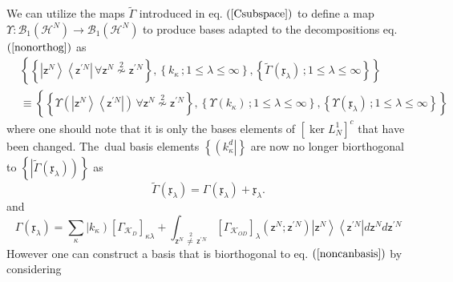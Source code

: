 \documentclass[aps,preprint]{revtex4}%
\begin{document}
We can utilize the maps $\tilde{\Gamma}$ introduced in eq. $\left(
\ref{Csubspace}\right)  $ to define a map $\Upsilon:\mathcal{B}_{1}\left(
\mathcal{H}^{N}\right)  \rightarrow\mathcal{B}_{1}\left(  \mathcal{H}%
^{N}\right)  $ to produce bases adapted to the decompositions eq. $\left(
\ref{nonorthog}\right)  $ as
\begin{align}
&  \left\{  \left\{  \left\vert \mathsf{z}^{N}\right\rangle \left\langle
\mathsf{z}^{\prime N}\right\vert \,\forall\mathsf{z}^{N}\overset{2}{\nsim
}\mathsf{z}^{\prime N}\right\}  ,\left\{  k_{\kappa}\,;1\leq\lambda\leq
\infty\right\}  ,\left\{  \tilde{\Gamma}\left(  \mathfrak{x}_{\lambda}\right)
\,;1\leq\lambda\leq\infty\right\}  \right\} \nonumber\\
&  \equiv\left\{  \left\{  \Upsilon\left(  \left\vert \mathsf{z}%
^{N}\right\rangle \left\langle \mathsf{z}^{\prime N}\right\vert \right)
\,\forall\mathsf{z}^{N}\overset{2}{\nsim}\mathsf{z}^{\prime N}\right\}
,\left\{  \Upsilon\left(  k_{\kappa}\right)  \,;1\leq\lambda\leq
\infty\right\}  ,\left\{  \Upsilon\left(  \mathfrak{x}_{\lambda}\right)
\,;1\leq\lambda\leq\infty\right\}  \right\}  \label{noncanbasis}%
\end{align}
where one should note that it is only the bases elements of $\left[  \ker
L_{N}^{1}\right]  ^{c}$ that have been changed. The\emph{\ }dual basis
elements $\left\{  \left(  k_{\kappa}^{d}\right\vert \right\}  $ are now no
longer biorthogonal to $\left\{  \left\vert \tilde{\Gamma}\left(
\mathfrak{x}_{\lambda}\right)  \right)  \right\}  $ as%
\begin{equation}
\tilde{\Gamma}\left(  \mathfrak{x}_{\lambda}\right)  =\Gamma\left(
\mathfrak{x}_{\lambda}\right)  +\mathfrak{x}_{\lambda}.
\end{equation}
and
\begin{equation}
\Gamma\left(  \mathfrak{x}_{\lambda}\right)  =\sum_{\kappa}\left\vert
k_{\kappa}\right)  \left[  \Gamma_{\mathcal{K}_{D}}\right]  _{\kappa\lambda}+%
{\displaystyle\int_{\mathsf{z}^{N}\,\overset{2}{\neq\,}\mathsf{z}^{\prime N}}}
\left[  \Gamma_{\mathcal{K}_{OD}}\right]  _{\lambda}\left(  \mathsf{z}%
^{N};\mathsf{z}^{\prime N}\right)  \left\vert \mathsf{z}^{N}\right\rangle
\left\langle \mathsf{z}^{\prime N}\right\vert d\mathsf{z}^{N}d\mathsf{z}%
^{\prime N}%
\end{equation}
However one can construct a basis that is biorthogonal to eq. $\left(
\ref{noncanbasis}\right)  $ by considering
\end{document}
